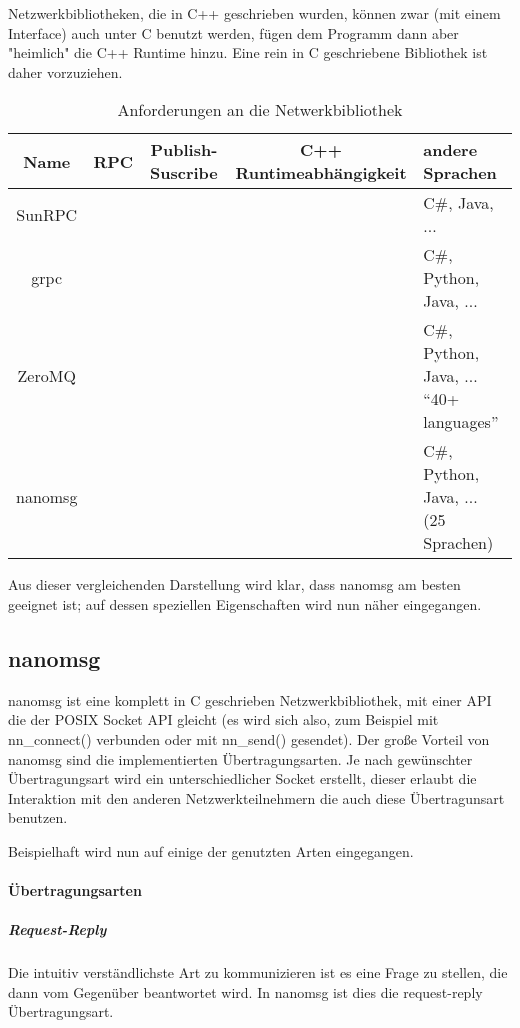 \documentclass[
    12pt,
    bibliography=totoc,
    ngerman,
	enabledeprecatedfontcommands
]{scrartcl}
\newcommand{\xmark}{\text{\sffamily X}} %
\begin{document}
Netzwerkbibliotheken, die in C++ geschrieben wurden, k{\"{o}}nnen zwar (mit einem Interface) auch unter C benutzt werden, f{\"{u}}gen dem Programm
dann aber "heimlich" die C++ Runtime hinzu. Eine rein in C geschriebene Bibliothek ist daher vorzuziehen.

\clearpage %
\begin{table}[h]
\centering
\begin{tabu}{c | c | c | c | p{5cm}}
	\toprule
	Name & RPC & Publish-Suscribe & C++ Runtimeabh{\"{a}}ngigkeit & andere Sprachen \\
	\midrule
	SunRPC & \checkmark & \xmark & \checkmark & C\#, Java, ... \\
	grpc\cite{grpc} & \checkmark & \xmark & \xmark & C\#, Python, Java, ... \\
	ZeroMQ\cite{zeromq} & \xmark & \checkmark & \xmark & C\#, Python, Java, ... \enquote{40+ languages} \\
	nanomsg\cite{nanomsg} & \xmark & \checkmark & \checkmark & C\#, Python, Java, ... (25 Sprachen) \\
	\bottomrule
\end{tabu}
\caption{Anforderungen an die Netwerkbibliothek}
\end{table}

Aus dieser vergleichenden Darstellung wird klar, dass nanomsg am besten geeignet ist; auf dessen speziellen Eigenschaften wird nun n{\"{a}}her eingegangen.

\subsection{nanomsg}
nanomsg ist eine komplett in C geschrieben Netzwerkbibliothek, mit einer API die der POSIX Socket API gleicht (es wird sich also, zum Beispiel mit nn\_connect() verbunden oder mit nn\_send() gesendet).
Der gro{\ss}e Vorteil von nanomsg sind die implementierten {\"{U}}bertragungsarten. Je nach gew{\"{u}}nschter {\"{U}}bertragungsart wird ein unterschiedlicher Socket erstellt, dieser erlaubt die
Interaktion mit den anderen Netzwerkteilnehmern die auch diese {\"{U}}bertragunsart benutzen.

Beispielhaft wird nun auf einige der genutzten Arten eingegangen.

\paragraph{{\"{U}}bertragungsarten}
\subparagraph{Request-Reply} Die intuitiv verst{\"{a}}ndlichste Art zu kommunizieren ist es eine Frage zu stellen, die dann vom Gegen{\"{u}}ber beantwortet wird. In nanomsg ist dies die request-reply
{\"{U}}bertragungsart.
\end{document}
